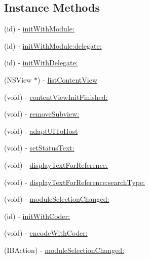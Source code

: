 \subsection*{Instance Methods}
\begin{DoxyCompactItemize}
\item 
(id) -\/ \hyperlink{interface_dictionary_view_controller_a8c5bc97166a49aea772e28ab6605dbe9}{init\-With\-Module\-:}
\item 
(id) -\/ \hyperlink{interface_dictionary_view_controller_ad97f4de6569fd584f9ceb1338e9a80d0}{init\-With\-Module\-:delegate\-:}
\item 
(id) -\/ \hyperlink{interface_dictionary_view_controller_a31987d71b58e0520588676a4f6896d2c}{init\-With\-Delegate\-:}
\item 
(N\-S\-View $\ast$) -\/ \hyperlink{interface_dictionary_view_controller_a726ea6c924bda6200d37751ca723d7b5}{list\-Content\-View}
\item 
(void) -\/ \hyperlink{interface_dictionary_view_controller_a0bd73ec236f8055ac6566b39ddf66add}{content\-View\-Init\-Finished\-:}
\item 
(void) -\/ \hyperlink{interface_dictionary_view_controller_afc97bbb7e9b0d2f6b9fd995ada16f4a1}{remove\-Subview\-:}
\item 
(void) -\/ \hyperlink{interface_dictionary_view_controller_acda22137b423344be66ad81dd4efc461}{adapt\-U\-I\-To\-Host}
\item 
(void) -\/ \hyperlink{interface_dictionary_view_controller_a86f5fa035efb2e0d568cf4cf9e621358}{set\-Status\-Text\-:}
\item 
(void) -\/ \hyperlink{interface_dictionary_view_controller_aee0469066a38e5b41b9de3e4e87fe05b}{display\-Text\-For\-Reference\-:}
\item 
(void) -\/ \hyperlink{interface_dictionary_view_controller_aee0f4fccfed1c999da9746c4a8ed6fc0}{display\-Text\-For\-Reference\-:search\-Type\-:}
\item 
(void) -\/ \hyperlink{interface_dictionary_view_controller_a97e40f01cf327aaf426740112764e170}{module\-Selection\-Changed\-:}
\item 
(id) -\/ \hyperlink{interface_dictionary_view_controller_a6cf57c30ef62d8a0b74eafd74d0f8b39}{init\-With\-Coder\-:}
\item 
(void) -\/ \hyperlink{interface_dictionary_view_controller_a958c5e82e2f22a1a132161999b5d1704}{encode\-With\-Coder\-:}
\item 
(I\-B\-Action) -\/ \hyperlink{interface_dictionary_view_controller_a97e40f01cf327aaf426740112764e170}{module\-Selection\-Changed\-:}
\end{DoxyCompactItemize}
